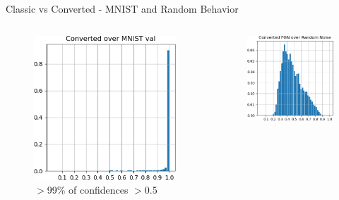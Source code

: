 \documentclass{beamer}
\begin{document}
\begin{frame}{Classic vs Converted - MNIST and Random Behavior}
    \vspace{-3mm}
    \begin{columns}
    \begin{column}{.33\textwidth}
    \begin{figure}
        \includegraphics[width=.9\textwidth]{images/mnist-behavior/converted-hist-val.png}
        \centering \tiny{$>$99\% of confidences $>$0.5}
    \end{figure}
    \end{column}
    \begin{column}{.33\textwidth}
    \begin{figure}
        \includegraphics[width=.91\textwidth]{images/mnist-behavior/converted-hist-random.png}

\end{figure}
\end{column}
\end{columns}
\end{frame}
\end{document}
